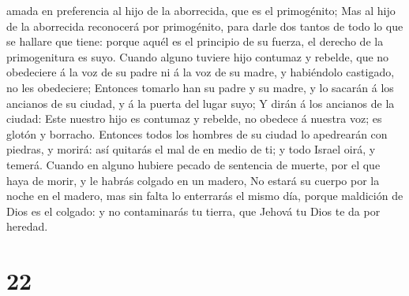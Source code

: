 amada en preferencia al hijo de la aborrecida, que es el primogénito;
 Mas al hijo de la aborrecida reconocerá por primogénito,
para darle dos tantos de todo lo que se hallare que tiene: porque aquél
es el principio de su fuerza, el derecho de la primogenitura es suyo.
 Cuando alguno tuviere hijo contumaz y rebelde, que no
obedeciere á la voz de su padre ni á la voz de su madre, y habiéndolo
castigado, no les obedeciere;  Entonces tomarlo han su
padre y su madre, y lo sacarán á los ancianos de su ciudad, y á la
puerta del lugar suyo;  Y dirán á los ancianos de la
ciudad: Este nuestro hijo es contumaz y rebelde, no obedece á nuestra
voz; es glotón y borracho.  Entonces todos los hombres de
su ciudad lo apedrearán con piedras, y morirá: así quitarás el mal de en
medio de ti; y todo Israel oirá, y temerá.  Cuando en
alguno hubiere pecado de sentencia de muerte, por el que haya de morir,
y le habrás colgado en un madero,  No estará su cuerpo por
la noche en el madero, mas sin falta lo enterrarás el mismo día, porque
maldición de Dios es el colgado: y no contaminarás tu tierra, que Jehová
tu Dios te da por heredad.

\hypertarget{section-21}{%
\section{22}\label{section-21}}

